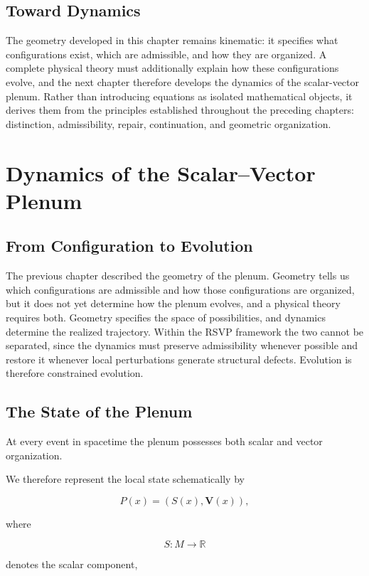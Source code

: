 \documentclass[11pt,oneside]{book}
\numberwithin{equation}{chapter}
\theoremstyle{definition}
\theoremstyle{plain}
\begin{document}
\section{Toward Dynamics}

The geometry developed in this chapter remains kinematic: it specifies what configurations exist, which are admissible, and how they are organized. A complete physical theory must additionally explain how these configurations evolve, and the next chapter therefore develops the dynamics of the scalar-vector plenum. Rather than introducing equations as isolated mathematical objects, it derives them from the principles established throughout the preceding chapters: distinction, admissibility, repair, continuation, and geometric organization.

\chapter{Dynamics of the Scalar--Vector Plenum}

\section{From Configuration to Evolution}

The previous chapter described the geometry of the plenum. Geometry tells us which configurations are admissible and how those configurations are organized, but it does not yet determine how the plenum evolves, and a physical theory requires both. Geometry specifies the space of possibilities, and dynamics determine the realized trajectory. Within the RSVP framework the two cannot be separated, since the dynamics must preserve admissibility whenever possible and restore it whenever local perturbations generate structural defects. Evolution is therefore constrained evolution.

\section{The State of the Plenum}

At every event in spacetime the plenum possesses both scalar and vector
organization.

We therefore represent the local state schematically by

\[
P(x)=
\left(
S(x),
\mathbf{V}(x)
\right),
\]

where

\[
S : M \rightarrow \mathbb{R}
\]

denotes the scalar component,
\end{document}
